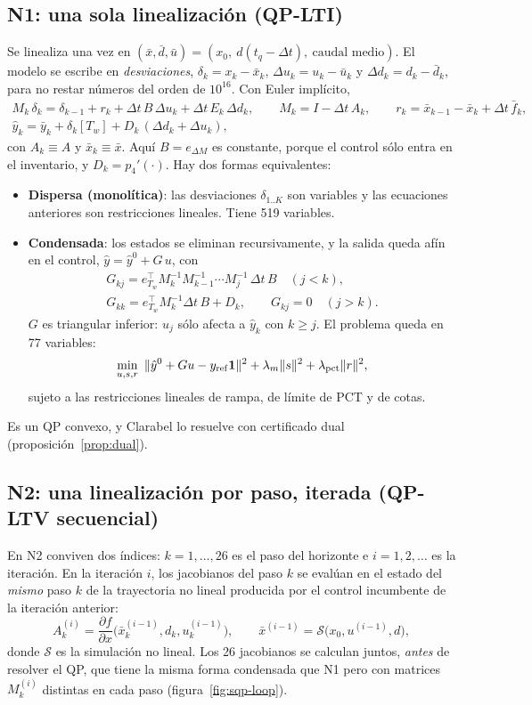 \subsection{N1: una sola linealización (QP-LTI)}
Se linealiza una vez en $(\bar x,\bar d,\bar u)=(x_0,\ d(t_q-\Delta t),\ \text{caudal medio})$.
El modelo se escribe en \emph{desviaciones},
$\delta_k=x_k-\bar x_k$, $\Delta u_k=u_k-\bar u_k$ y $\Delta d_k=d_k-\bar d_k$, para no restar
números del orden de $10^{16}$. Con Euler implícito,
\begin{gather*}
M_k\,\delta_k=\delta_{k-1}+r_k+\Delta t\,B\,\Delta u_k+\Delta t\,E_k\,\Delta d_k,\qquad
M_k=I-\Delta t\,A_k,\qquad r_k=\bar x_{k-1}-\bar x_k+\Delta t\,\bar f_k,\\
\hat y_k=\bar y_k+\delta_k[T_w]+D_k\,(\Delta d_k+\Delta u_k),
\end{gather*}
con $A_k\equiv A$ y $\bar x_k\equiv\bar x$. Aquí $B=e_{\Delta M}$ es constante, porque el
control sólo entra en el inventario, y $D_k=p_4'(\cdot)$. Hay dos formas equivalentes:
\begin{itemize}
  \item \textbf{Dispersa (monolítica)}: las desviaciones $\delta_{1..K}$ son variables y las
        ecuaciones anteriores son restricciones lineales. Tiene 519 variables.
  \item \textbf{Condensada}: los estados se eliminan recursivamente, y la salida queda afín en
        el control, $\hat y=\hat y^0+G\,u$, con
        \begin{gather*}
        G_{kj}=e_{T_w}^\top M_k^{-1}M_{k-1}^{-1}\cdots M_j^{-1}\,\Delta t\,B\quad(j<k),\\
        G_{kk}=e_{T_w}^\top M_k^{-1}\Delta t\,B+D_k,\qquad G_{kj}=0\quad(j>k).
        \end{gather*}
        $G$ es triangular inferior: $u_j$ sólo afecta a $\hat y_k$ con $k\ge j$. El problema
        queda en 77 variables:
        \[
        \min_{u,s,r}\ \|\hat y^0+Gu-y_{\rm ref}\mathbf 1\|^2+\lambda_m\|s\|^2+\lambda_{\rm pct}\|r\|^2,
        \]
        sujeto a las restricciones lineales de rampa, de límite de PCT y de cotas.
\end{itemize}
Es un QP convexo, y Clarabel lo resuelve con certificado dual (proposición~\ref{prop:dual}).

\subsection{N2: una linealización por paso, iterada (QP-LTV secuencial)}
En N2 conviven dos índices: $k=1,\dots,26$ es el paso del horizonte e $i=1,2,\dots$ es la
iteración. En la iteración $i$, los jacobianos del paso $k$ se evalúan en el estado del
\emph{mismo} paso $k$ de la trayectoria no lineal producida por el control incumbente de
la iteración anterior:
\[
A_k^{(i)}=\frac{\partial f}{\partial x}\Big(\bar x_k^{(i-1)},d_k,u_k^{(i-1)}\Big),\qquad
\bar x^{(i-1)}=\mathcal S\big(x_0,u^{(i-1)},d\big),
\]
donde $\mathcal S$ es la simulación no lineal. Los 26 jacobianos se calculan juntos,
\emph{antes} de resolver el QP, que tiene la misma forma condensada que N1 pero con
matrices $M_k^{(i)}$ distintas en cada paso (figura~\ref{fig:sqp-loop}).

